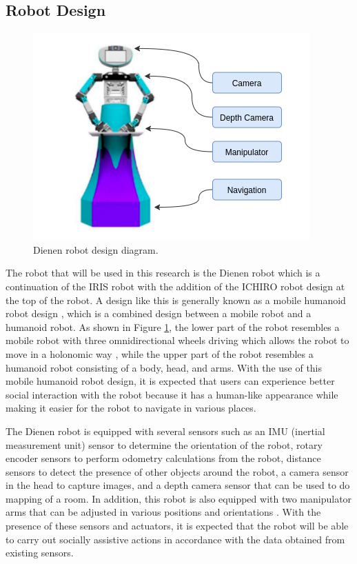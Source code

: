 \subsection{Robot Design}
\label{subsec:robotdesign}

\begin{figure} [ht]
  \centering
  \includegraphics[scale=0.55]{images/robot-design.png}
  \caption{Dienen robot design diagram.}
  \label{fig:robotdesign}
\end{figure}

The robot that will be used in this research is the Dienen robot which is a continuation of the IRIS robot \citep{dikairono2020}\citep{zanuar2019} with the addition of the ICHIRO robot \citep{muhtadin2019} design at the top of the robot.
A design like this is generally known as a mobile humanoid robot design \citep{mohamed2012},
  which is a combined design between a mobile robot and a humanoid robot.
As shown in Figure \ref{fig:robotdesign},
  the lower part of the robot resembles a mobile robot with three omnidirectional wheels driving which allows the robot to move in a holonomic way \citep{oliveira2008},
  while the upper part of the robot resembles a humanoid robot consisting of a body, head, and arms.
With the use of this mobile humanoid robot design,
  it is expected that users can experience better social interaction with the robot because it has a human-like appearance \citep{rossi2018} while making it easier for the robot to navigate in various places.

The Dienen robot is equipped with several sensors such as an IMU (inertial measurement unit) sensor to determine the orientation of the robot,
  rotary encoder sensors to perform odometry calculations from the robot,
  distance sensors to detect the presence of other objects around the robot,
  a camera sensor in the head to capture images,
  and a depth camera sensor that can be used to do mapping of a room.
In addition, this robot is also equipped with two manipulator arms that can be adjusted in various positions and orientations \citep{iqbal2012}.
With the presence of these sensors and actuators,
  it is expected that the robot will be able to carry out socially assistive actions in accordance with the data obtained from existing sensors.
